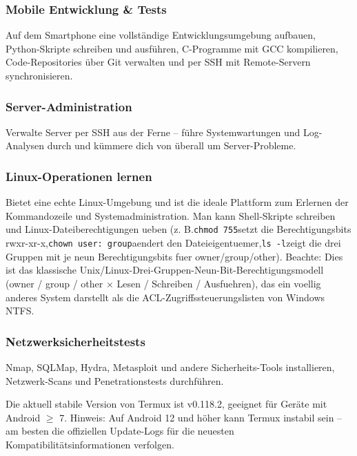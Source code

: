 \subsubsection*{Mobile Entwicklung \& Tests}

Auf dem Smartphone eine vollständige Entwicklungsumgebung aufbauen, Python-Skripte schreiben und ausführen, C-Programme mit GCC kompilieren, Code-Repositories über Git verwalten und per SSH mit Remote-Servern synchronisieren.

\subsubsection*{Server-Administration}

Verwalte Server per SSH aus der Ferne – führe Systemwartungen und Log-Analysen durch und kümmere dich von überall um Server-Probleme.

\subsubsection*{Linux-Operationen lernen}

Bietet eine echte Linux-Umgebung und ist die ideale Plattform zum Erlernen der Kommandozeile und Systemadministration. Man kann Shell-Skripte schreiben und Linux-Dateiberechtigungen ueben (z. B.\texttt{chmod 755}setzt die Berechtigungsbits rwxr-xr-x,\texttt{chown user: group}aendert den Dateieigentuemer,\texttt{ls -\allowbreak l}zeigt die drei Gruppen mit je neun Berechtigungsbits fuer owner/group/other). Beachte: Dies ist das klassische Unix/Linux-Drei-Gruppen-Neun-Bit-Berechtigungsmodell (owner / group / other × Lesen / Schreiben / Ausfuehren), das ein voellig anderes System darstellt als die ACL-Zugriffssteuerungslisten von Windows NTFS.

\subsubsection*{Netzwerksicherheitstests}

Nmap, SQLMap, Hydra, Metasploit und andere Sicherheits-Tools installieren, Netzwerk-Scans und Penetrationstests durchführen.


Die aktuell stabile Version von Termux ist v0.118.2, geeignet für Geräte mit Android $\geq$ 7. Hinweis: Auf Android 12 und höher kann Termux instabil sein – am besten die offiziellen Update-Logs für die neuesten Kompatibilitätsinformationen verfolgen.

